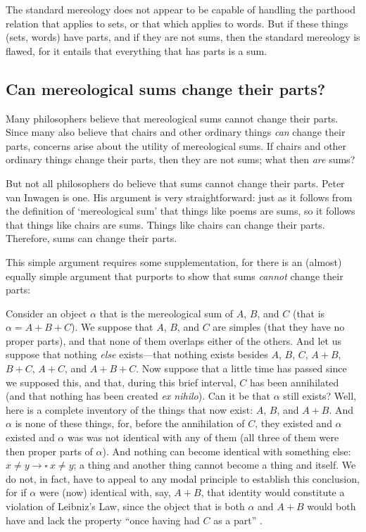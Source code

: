 \documentclass[11pt]{article}
\newenvironment{squote}{%
\begin{spacing}{1}
\begin{list}{}{%
\setlength{\labelwidth}{0pt}%
\rightmargin\leftmargin%
}
\item\relax
}{%
\end{list}%
\end{spacing}
}
\begin{document}
\begin{spacing}{1.5}
The standard mereology does not appear to be capable of handling the
parthood relation that applies to sets, or that which applies to
words.  But if these things (sets, words) have parts, and if they are
not sums, then the standard mereology is flawed, for it entails that
everything that has parts is a sum.

\subsection{Can mereological sums change their parts?}
\label{change}
Many philosophers believe that mereological sums cannot change their
parts.  Since many also believe that chairs and other ordinary things
{\em can} change their parts, concerns arise about the utility of
mereological sums.  If chairs and other ordinary things change their
parts, then they are not sums; what then {\em are} sums?

But not all philosophers do believe that sums cannot change their
parts.  Peter van Inwagen is one.  His argument is very
straightforward:  just as it follows from the definition of
`mereological sum' that things like poems are sums, so it follows that
things like chairs are sums.  Things like chairs can change their
parts.  Therefore, sums can change their parts.

This simple argument requires some supplementation, for there is an
(almost) equally simple argument that purports to show that sums {\em
  cannot} change their parts:

\begin{squote}
Consider an object $\alpha$ that is the mereological sum of $A$, $B$,
and $C$ (that is $\alpha = A + B + C$).  We suppose that $A$, $B$, and
$C$ are simples (that they have no proper parts), and that none of
them overlaps either of the others.  And let us suppose that nothing
{\em else} exists---that nothing exists besides $A$, $B$, $C$, $A +
B$, $B + C$, $A + C$, and $A + B + C$.  Now suppose that a little time
has passed since we supposed this, and that, during this brief
interval, $C$ has been annihilated (and that nothing has been created
{\em ex nihilo}).  Can it be that $\alpha$ still exists?  Well, here
is a complete inventory of the things that now exist: $A$, $B$, and $A
+ B$.  And $\alpha$ is none of these things, for, before the
annihilation of $C$, they existed and $\alpha$ existed and $\alpha$
was was not identical with any of them (all three of them were then
proper parts of $\alpha$).  And nothing can become identical with
something else: $x \neq y \rightarrow \square\ x \neq y$; a thing and
another thing cannot become a thing and itself.  We do not, in fact,
have to appeal to any modal principle to establish this conclusion,
for if $\alpha$ were (now) identical with, say, $A + B$, that identity
would constitute a violation of Leibniz's Law, since the object that
is both $\alpha$ and $A + B$ would both have and lack the property
``once having had $C$ as a part'' \citep[628]{inwagen2006}.
\end{squote}


\end{spacing}
\end{document}
